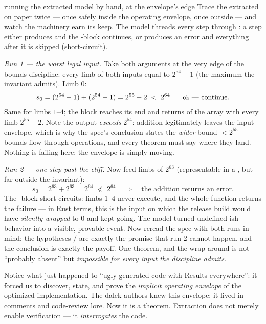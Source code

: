 \begin{worked}{running the extracted model by hand, at the envelope's edge}
Trace the extracted  on paper twice --- once
safely inside the operating envelope, once outside --- and watch the
 machinery earn its keep. The model threads every step
through : a step either produces  and the
-block continues, or produces an error and everything after it
is skipped (short-circuit).

\emph{Run 1 --- the worst legal input.} Take both arguments at the very
edge of the bounds discipline: every limb of both inputs equal to
$2^{54} - 1$ (the maximum the invariant  admits).
Limb $0$:
\[
s_0 = (2^{54}-1) + (2^{54}-1) = 2^{55} - 2 \;<\; 2^{64}. \quad
\text{\lean{.ok} --- continue.}
\]
Same for limbs $1$--$4$; the block reaches its end and returns
 of the array with every limb $2^{55}-2$. Note the output
\emph{exceeds} $2^{54}$: addition legitimately leaves the input envelope,
which is why the spec's conclusion states the \emph{wider} bound
$< 2^{55}$ --- bounds flow through operations, and every theorem must say
where they land. Nothing is failing here; the envelope is simply moving.

\emph{Run 2 --- one step past the cliff.} Now feed limbs of $2^{63}$
(representable in a , but far outside the invariant):
\[
s_0 = 2^{63} + 2^{63} = 2^{64}
\;\not<\; 2^{64}
\quad\Longrightarrow\quad \text{the addition returns an error.}
\]
The -block short-circuits: limbs $1$--$4$ never execute, and the
whole function returns the failure --- in Rust terms, this is the input on
which the release build would have \emph{silently wrapped} to $0$ and kept
going. The model turned undefined-ish behavior into a visible, provable
event. Now reread the spec with both runs in mind: the hypotheses
/ are exactly the promise that
run 2 cannot happen, and the conclusion  is
exactly the payoff. One theorem, and the wrap-around is not ``probably
absent'' but \emph{impossible for every input the discipline admits}.
\end{worked}

\begin{aha}
Notice what just happened to ``ugly generated code with Results
everywhere'': it forced us to discover, state, and prove the \emph{implicit
operating envelope} of the optimized implementation. The dalek authors knew
this envelope; it lived in comments and code-review lore. Now it is a
theorem. Extraction does not merely enable verification --- it
\emph{interrogates} the code.
\end{aha}

